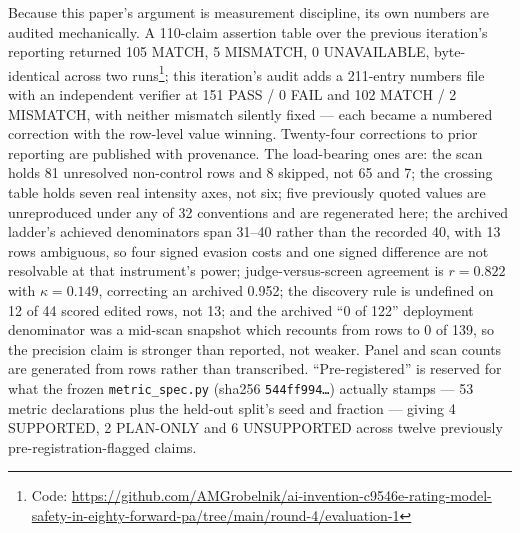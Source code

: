 \documentclass[11pt,letterpaper]{article}
\begin{document}
Because this paper's argument is measurement discipline, its own numbers are audited mechanically. A 110-claim assertion table over the previous iteration's reporting returned 105 MATCH, 5 MISMATCH, 0 UNAVAILABLE, byte-identical across two runs\footnote{Code: \url{https://github.com/AMGrobelnik/ai-invention-c9546e-rating-model-safety-in-eighty-forward-pa/tree/main/round-4/evaluation-1}}; this iteration's audit adds a 211-entry numbers file with an independent verifier at 151 PASS / 0 FAIL and 102 MATCH / 2 MISMATCH, with neither mismatch silently fixed --- each became a numbered correction with the row-level value winning. Twenty-four corrections to prior reporting are published with provenance. The load-bearing ones are: the scan holds 81 unresolved non-control rows and 8 skipped, not 65 and 7; the crossing table holds seven real intensity axes, not six; five previously quoted values are unreproduced under any of 32 conventions and are regenerated here; the archived ladder's achieved denominators span 31--40 rather than the recorded 40, with 13 rows ambiguous, so four signed evasion costs and one signed difference are not resolvable at that instrument's power; judge-versus-screen agreement is $r = 0.822$ with $\kappa = 0.149$, correcting an archived 0.952; the discovery rule is undefined on 12 of 44 scored edited rows, not 13; and the archived ``0 of 122'' deployment denominator was a mid-scan snapshot which recounts from rows to 0 of 139, so the precision claim is stronger than reported, not weaker. Panel and scan counts are generated from rows rather than transcribed. ``Pre-registered'' is reserved for what the frozen \texttt{metric\_spec.py} (sha256 \texttt{544ff994\ldots}) actually stamps --- 53 metric declarations plus the held-out split's seed and fraction --- giving 4 SUPPORTED, 2 PLAN-ONLY and 6 UNSUPPORTED across twelve previously pre-registration-flagged claims.



\end{document}
